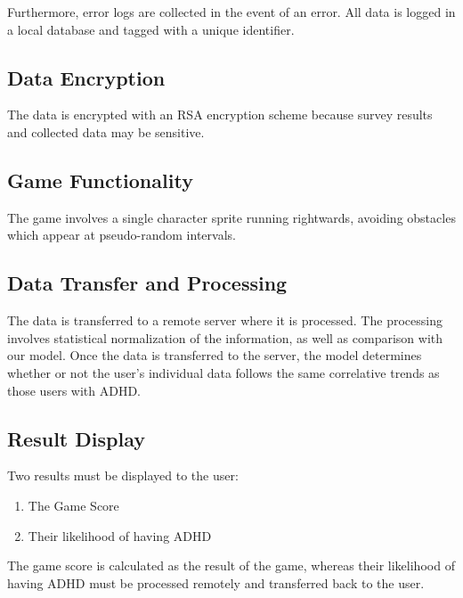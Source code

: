 \documentclass[a4wide]{article}
\begin{document}
Furthermore, error logs are collected in the event of an error. All data is logged in a local database and tagged with a unique identifier.

\subsection{Data Encryption}
The data is encrypted with an RSA encryption scheme because survey results and collected data may be sensitive.

\subsection{Game Functionality}
The game involves a single character sprite running rightwards, avoiding obstacles which appear at pseudo-random intervals.

\subsection{Data Transfer and Processing}
The data is transferred to a remote server where it is processed. The processing involves statistical normalization of the information, as well as comparison with our model. Once the data is transferred to the server, the model determines whether or not the user's individual data follows the same correlative trends as those users with ADHD. 

\subsection{Result Display}
Two results must be displayed to the user:
\begin{enumerate}
\item The Game Score
\item Their likelihood of having ADHD
\end{enumerate}
The game score is calculated as the result of the game, whereas their likelihood of having ADHD must be processed remotely and transferred back to the user. 
\end{document}
